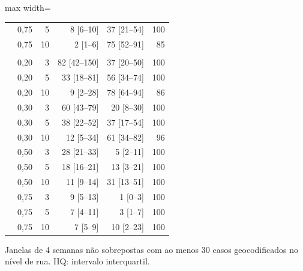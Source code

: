 \begin{table}[htbp]
\begin{adjustbox}{max width=\linewidth}
\begin{tabular}{llrrrr}
 & 0,75 & 5 & 8 [6--10] & 37 [21--54] & 100 \\
 & 0,75 & 10 & 2 [1--6] & 75 [52--91] & 85 \\
\addlinespace
\multicolumn{6}{l}{\textit{Incidência alta ($>$400); 28 janelas}} \\
 & 0,20 & 3 & 82 [42--150] & 37 [20--50] & 100 \\
 & 0,20 & 5 & 33 [18--81] & 56 [34--74] & 100 \\
 & 0,20 & 10 & 9 [2--28] & 78 [64--94] & 86 \\
 & 0,30 & 3 & 60 [43--79] & 20 [8--30] & 100 \\
 & 0,30 & 5 & 38 [22--52] & 37 [17--54] & 100 \\
 & 0,30 & 10 & 12 [5--34] & 61 [34--82] & 96 \\
 & 0,50 & 3 & 28 [21--33] & 5 [2--11] & 100 \\
 & 0,50 & 5 & 18 [16--21] & 13 [3--21] & 100 \\
 & 0,50 & 10 & 11 [9--14] & 31 [13--51] & 100 \\
 & 0,75 & 3 & 9 [5--13] & 1 [0--3] & 100 \\
 & 0,75 & 5 & 7 [4--11] & 3 [1--7] & 100 \\
 & 0,75 & 10 & 7 [5--9] & 10 [2--23] & 100 \\
\bottomrule
\end{tabular}
\end{adjustbox}
\par\smallskip\begin{minipage}{0.95\linewidth}\footnotesize Janelas de 4 semanas não sobrepostas com ao menos 30 casos geocodificados no nível de rua. IIQ: intervalo interquartil.\end{minipage}
\end{table}
